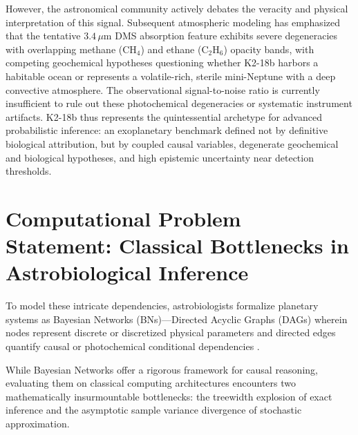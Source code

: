 However, the astronomical community actively debates the veracity and physical interpretation of this signal. Subsequent atmospheric modeling has emphasized that the tentative $3.4\,\mu\mathrm{m}$ DMS absorption feature exhibits severe degeneracies with overlapping methane ($\mathrm{CH}_4$) and ethane ($\mathrm{C}_2\mathrm{H}_6$) opacity bands, with competing geochemical hypotheses questioning whether K2-18b harbors a habitable ocean or represents a volatile-rich, sterile mini-Neptune with a deep convective atmosphere. The observational signal-to-noise ratio is currently insufficient to rule out these photochemical degeneracies or systematic instrument artifacts. K2-18b thus represents the quintessential archetype for advanced probabilistic inference: an exoplanetary benchmark defined not by definitive biological attribution, but by coupled causal variables, degenerate geochemical and biological hypotheses, and high epistemic uncertainty near detection thresholds.

\section{Computational Problem Statement: Classical Bottlenecks in Astrobiological Inference}\label{sec:computational_problem}

To model these intricate dependencies, astrobiologists formalize planetary systems as Bayesian Networks (BNs)---Directed Acyclic Graphs (DAGs) wherein nodes represent discrete or discretized physical parameters and directed edges quantify causal or photochemical conditional dependencies \cite{pearl1988}.



While Bayesian Networks offer a rigorous framework for causal reasoning, evaluating them on classical computing architectures encounters two mathematically insurmountable bottlenecks: the treewidth explosion of exact inference and the asymptotic sample variance divergence of stochastic approximation.

